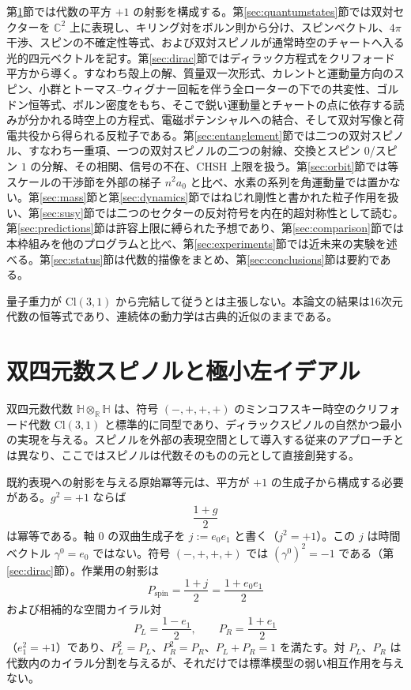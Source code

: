 \documentclass[a4paper]{article}
\begin{document}
第\ref{sec:spinor}節では代数の平方 $+1$ の射影を構成する。第\ref{sec:quantumstates}節では双対セクターを $\mathbb{C}^2$ 上に表現し、キリング対をボルン則から分け、スピンベクトル、$4\pi$ 干渉、スピンの不確定性等式、および双対スピノルが通常時空のチャートへ入る光的四元ベクトルを記す。第\ref{sec:dirac}節ではディラック方程式をクリフォード平方から導く。すなわち殻上の解、質量双一次形式、カレントと運動量方向のスピン、小群とトーマス--ウィグナー回転を伴う全ローターの下での共変性、ゴルドン恒等式、ボルン密度をもち、そこで鋭い運動量とチャートの点に依存する読みが分かれる時空上の方程式、電磁ポテンシャルへの結合、そして双対写像と荷電共役から得られる反粒子である。第\ref{sec:entanglement}節では二つの双対スピノル、すなわち一重項、一つの双対スピノルの二つの射線、交換とスピン $0$/スピン $1$ の分解、その相関、信号の不在、CHSH 上限を扱う。第\ref{sec:orbit}節では等スケールの干渉節を外部の梯子 \(n^{2}a_{0}\) と比べ、水素の系列を角運動量では置かない。第\ref{sec:mass}節と第\ref{sec:dynamics}節ではねじれ剛性と書かれた粒子作用を扱い、第\ref{sec:susy}節では二つのセクターの反対符号を内在的超対称性として読む。第\ref{sec:predictions}節は許容上限に縛られた予想であり、第\ref{sec:comparison}節では本枠組みを他のプログラムと比べ、第\ref{sec:experiments}節では近未来の実験を述べる。第\ref{sec:status}節は代数的描像をまとめ、第\ref{sec:conclusions}節は要約である。

量子重力が $\mathrm{Cl}(3,1)$ から完結して従うとは主張しない。本論文の結果は16次元代数の恒等式であり、連続体の動力学は古典的近似のままである。

\section{双四元数スピノルと極小左イデアル}
\label{sec:spinor}

双四元数代数 $\mathbb{H}\otimes_{\mathbb{R}}\mathbb{H}$ は、符号 $(-,+,+,+)$ のミンコフスキー時空のクリフォード代数 $\mathrm{Cl}(3,1)$ と標準的に同型であり、ディラックスピノルの自然かつ最小の実現を与える。スピノルを外部の表現空間として導入する従来のアプローチとは異なり、ここではスピノルは代数そのものの元として直接創発する。

既約表現への射影を与える原始冪等元は、平方が $+1$ の生成子から構成する必要がある。$g^2=+1$ ならば
\[
\frac{1+g}{2}
\]
は冪等である。軸 $0$ の双曲生成子を $j:=e_0 e_1$ と書く（$j^2=+1$）。この $j$ は時間ベクトル $\gamma^0=e_0$ ではない。符号 $(-,+,+,+)$ では $(\gamma^0)^2=-1$ である（第\ref{sec:dirac}節）。作業用の射影は
\[
P_{\mathrm{spin}} = \frac{1+j}{2}=\frac{1+e_0 e_1}{2}
\]
および相補的な空間カイラル対
\[
P_L = \frac{1-e_1}{2},\qquad P_R = \frac{1+e_1}{2}
\]
（$e_1^2=+1$）であり、$P_L^2=P_L$、$P_R^2=P_R$、$P_L+P_R=1$ を満たす。対 $P_L$、$P_R$ は代数内のカイラル分割を与えるが、それだけでは標準模型の弱い相互作用を与えない。
\end{document}

